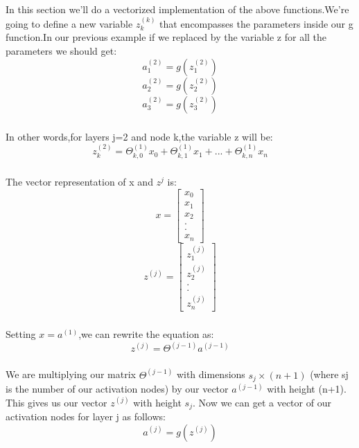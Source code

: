 \documentclass{article}
\begin{document}
\begin{CJK}{UTF8}{gbsn}
\begin{figure}[H]
\label{fig:415}
\end{figure}
\subparagraph{}
In this section we'll do a vectorized implementation of the above functions.We're going to define a new variable $z_k^{(k)}$ that encompasses the parameters inside our g function.In our previous example if we replaced by the variable z for all the parameters we should get:
\begin{equation}
a_1^{(2)}=g(z_1^{(2)})
\end{equation}
\begin{equation}
a_2^{(2)}=g(z_2^{(2)})
\end{equation}
\begin{equation}
a_3^{(2)}=g(z_3^{(2)})
\end{equation}
\subparagraph{}
In other words,for layers j=2 and node k,the variable z will be:
\begin{equation}
z_k^{(2)}=\Theta_{k,0}^{(1)}x_0+\Theta_{k,1}^{(1)}x_1+...+\Theta_{k,n}^{(1)}x_n
\end{equation}
\subparagraph{}
The vector representation of x and $z^j$ is:
\begin{equation}
x=\left[\begin{matrix}
x_0\\x_1\\x_2\\.\\.\\x_n
\end{matrix}\right]
\end{equation}
\begin{equation}
z^{(j)}=\left[\begin{matrix}
z_1^{(j)}\\z_2^{(j)}\\.\\.\\z_n^{(j)}
\end{matrix}\right]
\end{equation}
\subparagraph{}
Setting $x=a^{(1)}$,we can rewrite the equation as:
\begin{equation}
z^{(j)}=\Theta^{(j-1)}a^{(j-1)}
\end{equation}
\subparagraph{}
We are multiplying our matrix $\Theta^{(j-1)}$ with dimensions $s_j\times(n+1)$ (where sj is the number of our activation nodes) by our vector $a^{(j-1)}$ with height (n+1). This gives us our vector $z^{(j)}$ with height $s_j$. Now we can get a vector of our activation nodes for layer j as follows:
\begin{equation}
a^{(j)}=g(z^{(j)})

\end{equation}
\end{CJK}
\end{document}
